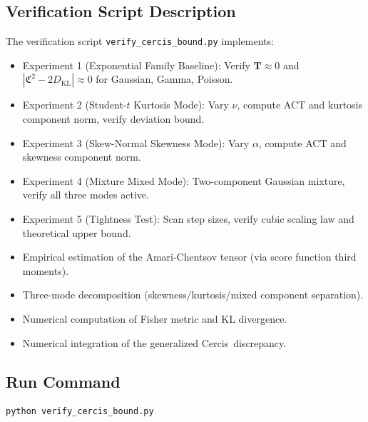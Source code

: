 \documentclass[12pt,a4paper]{article}
\theoremstyle{plain}
\theoremstyle{definition}
\theoremstyle{remark}
\newcommand{\Cercis}{\textsf{Cercis}}
\newcommand{\DKL}{D_{\mathrm{KL}}}
\newcommand{\CercisScore}{\mathfrak{C}}
\newcommand{\ACT}{\mathbf{T}}    %
\begin{document}
\subsection{Verification Script Description}

The verification script \texttt{verify\_cercis\_bound.py} implements:
\begin{itemize}
    \item Experiment 1 (Exponential Family Baseline): Verify $\ACT \approx 0$ and $|\CercisScore^2 - 2\DKL| \approx 0$ for Gaussian, Gamma, Poisson.
    \item Experiment 2 (Student-$t$ Kurtosis Mode): Vary $\nu$, compute ACT and kurtosis component norm, verify deviation bound.
    \item Experiment 3 (Skew-Normal Skewness Mode): Vary $\alpha$, compute ACT and skewness component norm.
    \item Experiment 4 (Mixture Mixed Mode): Two-component Gaussian mixture, verify all three modes active.
    \item Experiment 5 (Tightness Test): Scan step sizes, verify cubic scaling law and theoretical upper bound.
    \item Empirical estimation of the Amari-Chentsov tensor (via score function third moments).
    \item Three-mode decomposition (skewness/kurtosis/mixed component separation).
    \item Numerical computation of Fisher metric and KL divergence.
    \item Numerical integration of the generalized \Cercis\ discrepancy.
\end{itemize}

\subsection{Run Command}
\begin{verbatim}
python verify_cercis_bound.py
\end{verbatim}
\end{document}
